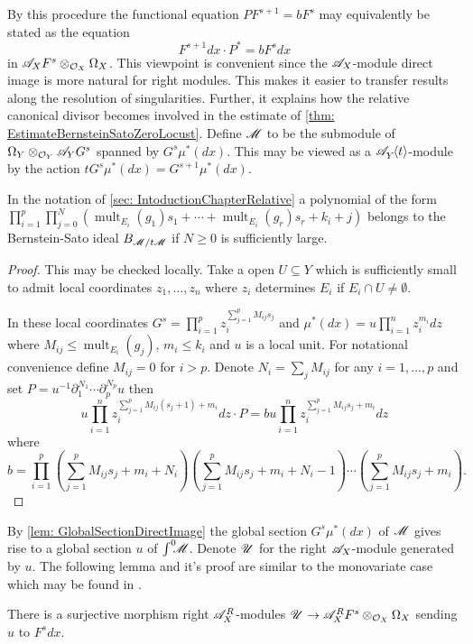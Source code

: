 By this procedure the functional equation $P F^{s+1} = b F^s$ may equivalently be stated as the equation
$$F^{s+1}dx \cdot P^* = b F^s dx $$
in $\mathscr{A}_X F^s \otimes_{\mathcal{O}_X}\Omega_X$.
This viewpoint is convenient since the $\mathscr{A}_X$-module direct image is more natural for right modules.
This makes it easier to transfer results along the resolution of singularities.
Further, it explains how the relative canonical divisor becomes involved in the estimate of \cref{thm: EstimateBernsteinSatoZeroLocust}.
Define $\mathscr{M}$ to be the submodule of $\Omega_Y\otimes_{\mathcal{O}_Y} \mathscr{A}_Y G^s$ spanned by $G^s \mu^*(dx)$.
This may be viewed as a $\mathscr{A}_{Y}^{}\mkern-5mu\left\langle t \right\rangle$-module by the action $t G^s \mu^*(dx) = G^{s+1} \mu^*(dx)$.
\begin{lemma}\label{lem: BernsteinSatoPolynomialUpstairs}
  In the notation of \cref{sec: IntoductionChapterRelative} a polynomial of the form
  $\prod_{i=1}^p \prod_{j=0}^N(\operatorname{mult}_{E_i}(g_1) s_1 + \cdots + \operatorname{mult}_{E_i}(g_r)s_r + k_i + j)$
  belongs to the Bernstein-Sato ideal $B_{\mathscr{M}/t\mathscr{M}}$ if $N\geq 0$ is sufficiently large.
\end{lemma}
\begin{proof}
  This may be checked locally.
  Take a open $U\subseteq Y$ which is sufficiently small to admit local coordinates $z_1,\ldots,z_n$ where $z_i$ determines $E_i$ if $E_i\cap U \neq \emptyset$.

  In these local coordinates $G^s = \prod_{i=1}^p z_i^{\sum_{j=1}^p M_{ij}s_j}$ and $\mu^*(dx) = u \prod_{i=1}^n z_i^{m_i} dz$ where $M_{ij} \leq \operatorname{mult}_{E_i}(g_j)$, $m_i \leq k_i$ and $u$ is a local unit. For notational convenience define $M_{ij} = 0$ for $i>p$.
  Denote $N_i = \sum_j M_{ij}$ for any $i=1,\ldots,p$ and set $P = u^{-1} \partial_1^{N_1} \cdots \partial_p^{N_p} u$ then
  $$u\prod_{i=1}^n z_i^{\sum_{j=1}^p M_{ij}(s_j+1) + m_i}dz \cdot P =  b u \prod_{i=1}^nz_i^{\sum_{j=1}^p M_{ij}s_j + m_i}dz $$
  where
  $$b = \prod_{i=1}^p(\sum_{j=1}^p M_{ij}s_j + m_i + N_i)(\sum_{j=1}^p M_{ij}s_j + m_i + N_i - 1)\cdots(\sum_{j=1}^p M_{ij}s_j + m_i).$$
\end{proof}
By \cref{lem: GlobalSectionDirectImage} the global section $G^s \mu^*(dx)$ of $\mathscr{M}$ gives rise to a global section $u$ of $\int^0 \mkern -8mu\mathscr{M}$. Denote $\mathscr{U}$ for the right $\mathscr{A}_X$-module generated by $u$.
The following lemma and it's proof are similar to the monovariate case which may be found in \cite[p246]{bjork1979rings}.
\begin{lemma}
  There is a surjective morphism right $\mathscr{A}_X^R$-modules $\mathscr{U}\to \mathscr{A}_X^RF^s \otimes_{\mathcal{O}_X}\Omega_X$ sending $u$ to $F^sdx$.
\end{lemma}
